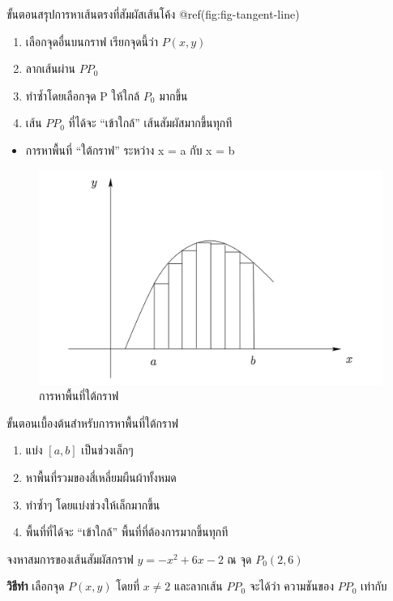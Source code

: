 \documentclass[
]{book}
\providecommand{\tightlist}{%
  \setlength{\itemsep}{0pt}\setlength{\parskip}{0pt}}
\begin{document}
ขั้นตอนสรุปการหาเส้นตรงที่สัมผัสเส้นโค้ง @ref(fig:fig-tangent-line)

\begin{enumerate}
\def\labelenumi{\arabic{enumi}.}
\item
  เลือกจุดอื่นบนกราฟ เรียกจุดนี้ว่า \(P(x,y)\)
\item
  ลากเส้นผ่าน \(PP_{0}\)
\item
  ทำซ้ำโดยเลือกจุด P ให้ใกล้ \(P_{0}\) มากขึ้น
\item
  เส้น \(PP_{0}\) ที่ได้จะ ``เข้าใกล้'' เส้นสัมผัสมากขึ้นทุกที
\end{enumerate}

\begin{itemize}
\tightlist
\item
  การหาพื้นที่ ``ใต้กราฟ'' ระหว่าง x = a กับ x = b
\end{itemize}

\begin{figure}

{\centering \includegraphics[width=0.5\linewidth]{images/fig-area-under-curve} 

}

\caption{การหาพื้นที่ใต้กราฟ}\label{fig:fig-area-under-curve}
\end{figure}

ขั้นตอนเบื้องต้นสำหรับการหาพื้นที่ใต้กราฟ

\begin{enumerate}
\def\labelenumi{\arabic{enumi}.}
\tightlist
\item
  แบ่ง \([a,b]\) เป็นช่วงเล็กๆ
\item
  หาพื้นที่รวมของสี่เหลี่ยมผืนผ้าทั้งหมด
\item
  ทำซ้ำๆ โดยแบ่งช่วงให้เล็กมากขึ้น
\item
  พื้นที่ที่ได้จะ ``เข้าใกล้'' พื้นที่ที่ต้องการมากขึ้นทุกที
\end{enumerate}

\label{ex-limit-1}
จงหาสมการของเส้นสัมผัสกราฟ \(y=-x^{2}+6x-2\) ณ จุด \(P_{0}(2,6)\)

\textbf{วิธีทำ} เลือกจุด \(P(x,y)\) โดยที่ \(x \neq 2\) และลากเส้น \(PP_{0}\)
จะได้ว่า ความชันของ \(PP_{0}\) เท่ากับ
\end{document}
